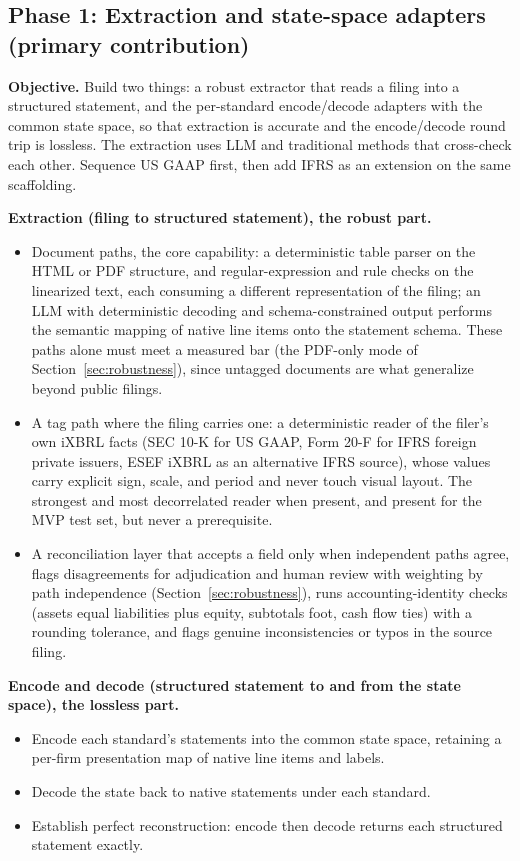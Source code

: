 \documentclass[11pt]{article}
\newcommand{\lead}[2]{\par\addvspace{5pt}\textbf{\textcolor{#1}{#2}}}
\begin{document}
\subsection{Phase 1: Extraction and state-space adapters (primary contribution)}
\lead{navytwo}{Objective.} Build two things: a robust extractor that reads a filing into a structured statement, and the per-standard encode/decode adapters with the common state space, so that extraction is accurate and the encode/decode round trip is lossless. The extraction uses LLM and traditional methods that cross-check each other. Sequence US GAAP first, then add IFRS as an extension on the same scaffolding.
\lead{navytwo}{Extraction (filing to structured statement), the robust part.}
\begin{itemize}
  \item Document paths, the core capability: a deterministic table parser on the HTML or PDF structure, and regular-expression and rule checks on the linearized text, each consuming a different representation of the filing; an LLM with deterministic decoding and schema-constrained output performs the semantic mapping of native line items onto the statement schema. These paths alone must meet a measured bar (the PDF-only mode of Section~\ref{sec:robustness}), since untagged documents are what generalize beyond public filings.
  \item A tag path where the filing carries one: a deterministic reader of the filer's own iXBRL facts (SEC 10-K for US GAAP, Form 20-F for IFRS foreign private issuers, ESEF iXBRL as an alternative IFRS source), whose values carry explicit sign, scale, and period and never touch visual layout. The strongest and most decorrelated reader when present, and present for the MVP test set, but never a prerequisite.
  \item A reconciliation layer that accepts a field only when independent paths agree, flags disagreements for adjudication and human review with weighting by path independence (Section~\ref{sec:robustness}), runs accounting-identity checks (assets equal liabilities plus equity, subtotals foot, cash flow ties) with a rounding tolerance, and flags genuine inconsistencies or typos in the source filing.
\end{itemize}
\lead{navytwo}{Encode and decode (structured statement to and from the state space), the lossless part.}
\begin{itemize}
  \item Encode each standard's statements into the common state space, retaining a per-firm presentation map of native line items and labels.
  \item Decode the state back to native statements under each standard.
  \item Establish perfect reconstruction: encode then decode returns each structured statement exactly.
\end{itemize}
\end{document}
